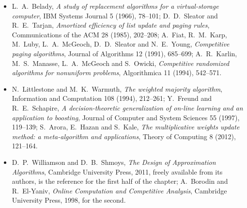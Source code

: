 \begin{itemize}
\item L.~A.~Belady, \emph{A study of replacement algorithms for a virtual-storage computer}, IBM Systems Journal 5 (1966), 78--101; D.~D.~Sleator and R.~E.~Tarjan, \emph{Amortized efficiency of list update and paging rules}, Communications of the ACM 28 (1985), 202--208; A.~Fiat, R.~M.~Karp, M.~Luby, L.~A.~McGeoch, D.~D.~Sleator and N.~E.~Young, \emph{Competitive paging algorithms}, Journal of Algorithms 12 (1991), 685--699; A.~R.~Karlin, M.~S.~Manasse, L.~A.~McGeoch and S.~Owicki, \emph{Competitive randomized algorithms for nonuniform problems}, Algorithmica 11 (1994), 542--571.
\item N.~Littlestone and M.~K.~Warmuth, \emph{The weighted majority algorithm}, Information and Computation 108 (1994), 212--261; Y.~Freund and R.~E.~Schapire, \emph{A decision-theoretic generalization of on-line learning and an application to boosting}, Journal of Computer and System Sciences 55 (1997), 119--139; S.~Arora, E.~Hazan and S.~Kale, \emph{The multiplicative weights update method: a meta-algorithm and applications}, Theory of Computing 8 (2012), 121--164.
\item D.~P.~Williamson and D.~B.~Shmoys, \emph{The Design of Approximation Algorithms}, Cambridge University Press, 2011, freely available from its authors, is the reference for the first half of the chapter; A.~Borodin and R.~El-Yaniv, \emph{Online Computation and Competitive Analysis}, Cambridge University Press, 1998, for the second.
\end{itemize}

